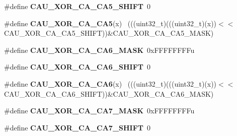 \begin{DoxyCompactItemize}
\item 
\hypertarget{group___c_a_u___register___masks_ga524e70cc275f9e2d963db75ea6dace92}{}\#define {\bfseries C\+A\+U\+\_\+\+X\+O\+R\+\_\+\+C\+A\+\_\+\+C\+A5\+\_\+\+S\+H\+I\+F\+T}~0\label{group___c_a_u___register___masks_ga524e70cc275f9e2d963db75ea6dace92}

\item 
\hypertarget{group___c_a_u___register___masks_gaf0c0b58add3ace7623fce028193a2baa}{}\#define {\bfseries C\+A\+U\+\_\+\+X\+O\+R\+\_\+\+C\+A\+\_\+\+C\+A5}(x)                                            ~(((uint32\+\_\+t)(((uint32\+\_\+t)(x))$<$$<$C\+A\+U\+\_\+\+X\+O\+R\+\_\+\+C\+A\+\_\+\+C\+A5\+\_\+\+S\+H\+I\+F\+T))\&C\+A\+U\+\_\+\+X\+O\+R\+\_\+\+C\+A\+\_\+\+C\+A5\+\_\+\+M\+A\+S\+K)\label{group___c_a_u___register___masks_gaf0c0b58add3ace7623fce028193a2baa}

\item 
\hypertarget{group___c_a_u___register___masks_ga6b422fcb6666aa9f5c25894082aa81d8}{}\#define {\bfseries C\+A\+U\+\_\+\+X\+O\+R\+\_\+\+C\+A\+\_\+\+C\+A6\+\_\+\+M\+A\+S\+K}~0x\+F\+F\+F\+F\+F\+F\+F\+Fu\label{group___c_a_u___register___masks_ga6b422fcb6666aa9f5c25894082aa81d8}

\item 
\hypertarget{group___c_a_u___register___masks_gadf7fdd8eaf9822fec5ac691246d95683}{}\#define {\bfseries C\+A\+U\+\_\+\+X\+O\+R\+\_\+\+C\+A\+\_\+\+C\+A6\+\_\+\+S\+H\+I\+F\+T}~0\label{group___c_a_u___register___masks_gadf7fdd8eaf9822fec5ac691246d95683}

\item 
\hypertarget{group___c_a_u___register___masks_ga852832434d5a7cb4a4a3b4a061c78d3a}{}\#define {\bfseries C\+A\+U\+\_\+\+X\+O\+R\+\_\+\+C\+A\+\_\+\+C\+A6}(x)                                            ~(((uint32\+\_\+t)(((uint32\+\_\+t)(x))$<$$<$C\+A\+U\+\_\+\+X\+O\+R\+\_\+\+C\+A\+\_\+\+C\+A6\+\_\+\+S\+H\+I\+F\+T))\&C\+A\+U\+\_\+\+X\+O\+R\+\_\+\+C\+A\+\_\+\+C\+A6\+\_\+\+M\+A\+S\+K)\label{group___c_a_u___register___masks_ga852832434d5a7cb4a4a3b4a061c78d3a}

\item 
\hypertarget{group___c_a_u___register___masks_ga06eab58058cee7fd45b4cd4275568892}{}\#define {\bfseries C\+A\+U\+\_\+\+X\+O\+R\+\_\+\+C\+A\+\_\+\+C\+A7\+\_\+\+M\+A\+S\+K}~0x\+F\+F\+F\+F\+F\+F\+F\+Fu\label{group___c_a_u___register___masks_ga06eab58058cee7fd45b4cd4275568892}

\item 
\hypertarget{group___c_a_u___register___masks_ga69445bae6fa41c545996396a9af56d61}{}\#define {\bfseries C\+A\+U\+\_\+\+X\+O\+R\+\_\+\+C\+A\+\_\+\+C\+A7\+\_\+\+S\+H\+I\+F\+T}~0\label{group___c_a_u___register___masks_ga69445bae6fa41c545996396a9af56d61}


\end{DoxyCompactItemize}
